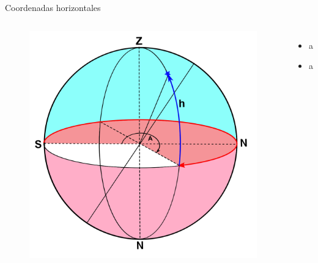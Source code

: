 \documentclass{beamer}
\begin{document}
\begin{frame}{Coordenadas horizontales}
 \begin{columns}
  \begin{figure}
   \centering
   \includegraphics[scale=0.14]{Imagenes/C_horizontales_01}
  \end{figure}
 \small
 \justify
\begin{itemize}
\item a
\item  a
\end{itemize}
 \end{columns}
\end{frame}
\end{document}
